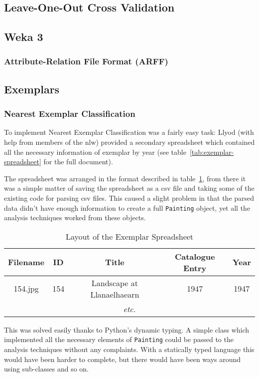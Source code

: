 \subsection{Leave-One-Out Cross Validation}

\subsection{Weka 3}
\subsubsection{Attribute-Relation File Format (ARFF)}

\subsection{Exemplars}
\subsubsection{Nearest Exemplar Classification}
To implement Nearest Exemplar Classification was a fairly easy task: Llyod (with help from members
of the \gls{nlw}) provided a secondary spreadsheet which contained all the necessary information 
of exemplar by year (see table~\ref{tab:exemplar-spreadsheet} for the full document).

The spreadsheet was arranged in the format described in table~\ref{tab:exemplar-layout}, from
there it was a simple matter of saving the spreadsheet as a \gls{csv} file and taking some of the
existing code for parsing \gls{csv} files. This caused a slight problem in that the parsed data
didn't have enough information to create a full \texttt{Painting} object, yet all the analysis
techniques worked from these objects.

\begin{table}[h]
\centering
\begin{tabular}{|c|c|c|c|c|} \hline
Filename & ID  & Title                      & Catalogue Entry & Year \\\hline
154.jpg  & 154 & Landscape at Llanaelhaearn & 1947            & 1947 \\\hline
\multicolumn{5}{|c|}{\textit{etc.}}\\\hline
\end{tabular}
\caption{Layout of the Exemplar Spreadsheet}\label{tab:exemplar-layout}
\end{table}

This was solved easily thanks to Python's dynamic typing. A simple class which implemented all the
necessary elements of \texttt{Painting} could be passed to the analysis techniques without any
complaints. With a statically typed language this would have been harder to complete, but there
would have been ways around using sub-classes and so on.

